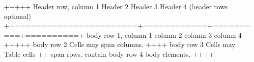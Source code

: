 \documentclass[letterpaper,11pt,english]{sphinxmanual}
\begin{document}
\begin{sphinxVerbatim}[commandchars=\\\{\}]
+\PYGZhy{}\PYGZhy{}\PYGZhy{}\PYGZhy{}\PYGZhy{}\PYGZhy{}\PYGZhy{}\PYGZhy{}\PYGZhy{}\PYGZhy{}\PYGZhy{}\PYGZhy{}\PYGZhy{}\PYGZhy{}\PYGZhy{}\PYGZhy{}\PYGZhy{}\PYGZhy{}\PYGZhy{}\PYGZhy{}\PYGZhy{}\PYGZhy{}\PYGZhy{}\PYGZhy{}+\PYGZhy{}\PYGZhy{}\PYGZhy{}\PYGZhy{}\PYGZhy{}\PYGZhy{}\PYGZhy{}\PYGZhy{}\PYGZhy{}\PYGZhy{}\PYGZhy{}\PYGZhy{}+\PYGZhy{}\PYGZhy{}\PYGZhy{}\PYGZhy{}\PYGZhy{}\PYGZhy{}\PYGZhy{}\PYGZhy{}\PYGZhy{}\PYGZhy{}+\PYGZhy{}\PYGZhy{}\PYGZhy{}\PYGZhy{}\PYGZhy{}\PYGZhy{}\PYGZhy{}\PYGZhy{}\PYGZhy{}\PYGZhy{}+
 Header row, column 1   \textbar{} Header 2   \textbar{} Header 3 \textbar{} Header 4 \textbar{}
 (header rows optional) \textbar{}            \textbar{}          \textbar{}          \textbar{}
+========================+============+==========+==========+
 body row 1, column 1   \textbar{} column 2   \textbar{} column 3 \textbar{} column 4 \textbar{}
+\PYGZhy{}\PYGZhy{}\PYGZhy{}\PYGZhy{}\PYGZhy{}\PYGZhy{}\PYGZhy{}\PYGZhy{}\PYGZhy{}\PYGZhy{}\PYGZhy{}\PYGZhy{}\PYGZhy{}\PYGZhy{}\PYGZhy{}\PYGZhy{}\PYGZhy{}\PYGZhy{}\PYGZhy{}\PYGZhy{}\PYGZhy{}\PYGZhy{}\PYGZhy{}\PYGZhy{}+\PYGZhy{}\PYGZhy{}\PYGZhy{}\PYGZhy{}\PYGZhy{}\PYGZhy{}\PYGZhy{}\PYGZhy{}\PYGZhy{}\PYGZhy{}\PYGZhy{}\PYGZhy{}+\PYGZhy{}\PYGZhy{}\PYGZhy{}\PYGZhy{}\PYGZhy{}\PYGZhy{}\PYGZhy{}\PYGZhy{}\PYGZhy{}\PYGZhy{}+\PYGZhy{}\PYGZhy{}\PYGZhy{}\PYGZhy{}\PYGZhy{}\PYGZhy{}\PYGZhy{}\PYGZhy{}\PYGZhy{}\PYGZhy{}+
 body row 2             \textbar{} Cells may span columns.          \textbar{}
+\PYGZhy{}\PYGZhy{}\PYGZhy{}\PYGZhy{}\PYGZhy{}\PYGZhy{}\PYGZhy{}\PYGZhy{}\PYGZhy{}\PYGZhy{}\PYGZhy{}\PYGZhy{}\PYGZhy{}\PYGZhy{}\PYGZhy{}\PYGZhy{}\PYGZhy{}\PYGZhy{}\PYGZhy{}\PYGZhy{}\PYGZhy{}\PYGZhy{}\PYGZhy{}\PYGZhy{}+\PYGZhy{}\PYGZhy{}\PYGZhy{}\PYGZhy{}\PYGZhy{}\PYGZhy{}\PYGZhy{}\PYGZhy{}\PYGZhy{}\PYGZhy{}\PYGZhy{}\PYGZhy{}+\PYGZhy{}\PYGZhy{}\PYGZhy{}\PYGZhy{}\PYGZhy{}\PYGZhy{}\PYGZhy{}\PYGZhy{}\PYGZhy{}\PYGZhy{}\PYGZhy{}\PYGZhy{}\PYGZhy{}\PYGZhy{}\PYGZhy{}\PYGZhy{}\PYGZhy{}\PYGZhy{}\PYGZhy{}\PYGZhy{}\PYGZhy{}+
 body row 3             \textbar{} Cells may  \textbar{} \PYGZhy{} Table cells       \textbar{}
+\PYGZhy{}\PYGZhy{}\PYGZhy{}\PYGZhy{}\PYGZhy{}\PYGZhy{}\PYGZhy{}\PYGZhy{}\PYGZhy{}\PYGZhy{}\PYGZhy{}\PYGZhy{}\PYGZhy{}\PYGZhy{}\PYGZhy{}\PYGZhy{}\PYGZhy{}\PYGZhy{}\PYGZhy{}\PYGZhy{}\PYGZhy{}\PYGZhy{}\PYGZhy{}\PYGZhy{}+ span rows. \textbar{} \PYGZhy{} contain           \textbar{}
 body row 4             \textbar{}            \textbar{} \PYGZhy{} body elements.    \textbar{}
+\PYGZhy{}\PYGZhy{}\PYGZhy{}\PYGZhy{}\PYGZhy{}\PYGZhy{}\PYGZhy{}\PYGZhy{}\PYGZhy{}\PYGZhy{}\PYGZhy{}\PYGZhy{}\PYGZhy{}\PYGZhy{}\PYGZhy{}\PYGZhy{}\PYGZhy{}\PYGZhy{}\PYGZhy{}\PYGZhy{}\PYGZhy{}\PYGZhy{}\PYGZhy{}\PYGZhy{}+\PYGZhy{}\PYGZhy{}\PYGZhy{}\PYGZhy{}\PYGZhy{}\PYGZhy{}\PYGZhy{}\PYGZhy{}\PYGZhy{}\PYGZhy{}\PYGZhy{}\PYGZhy{}+\PYGZhy{}\PYGZhy{}\PYGZhy{}\PYGZhy{}\PYGZhy{}\PYGZhy{}\PYGZhy{}\PYGZhy{}\PYGZhy{}\PYGZhy{}\PYGZhy{}\PYGZhy{}\PYGZhy{}\PYGZhy{}\PYGZhy{}\PYGZhy{}\PYGZhy{}\PYGZhy{}\PYGZhy{}\PYGZhy{}\PYGZhy{}+
\end{sphinxVerbatim}
\end{document}

